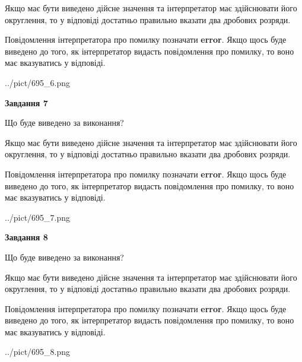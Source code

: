 \documentclass[12pt, ukrainian]{article}
\begin{document}
{\begin {Large}
Якщо має бути виведено дійсне значення та інтерпретатор має здійснювати його округлення, 
то у відповіді достатньо правильно вказати два дробових розряди.

Повідомлення інтерпретатора про помилку позначати \textbf{error}.
Якщо щось буде виведено до того, як інтерпретатор видасть повідомлення про помилку, 
то воно має вказуватись у відповіді. \par

\begin{center}
	{../pict/695_6.png}
\end{center}
\newpage

{\begin {center}\textbf{Завдання 7}\end {center}}\par
Що буде виведено за виконання? \par

Якщо має бути виведено дійсне значення та інтерпретатор має здійснювати його округлення, 
то у відповіді достатньо правильно вказати два дробових розряди.

Повідомлення інтерпретатора про помилку позначати \textbf{error}.
Якщо щось буде виведено до того, як інтерпретатор видасть повідомлення про помилку, 
то воно має вказуватись у відповіді. \par

\begin{center}
	{../pict/695_7.png}
\end{center}
\newpage

{\begin {center}\textbf{Завдання 8}\end {center}}\par
Що буде виведено за виконання? \par

Якщо має бути виведено дійсне значення та інтерпретатор має здійснювати його округлення, 
то у відповіді достатньо правильно вказати два дробових розряди.

Повідомлення інтерпретатора про помилку позначати \textbf{error}.
Якщо щось буде виведено до того, як інтерпретатор видасть повідомлення про помилку, 
то воно має вказуватись у відповіді. \par

\begin{center}
	{../pict/695_8.png}
\end{center}
\newpage


\end{Large}}
\end{document}
